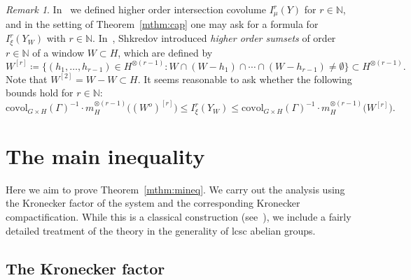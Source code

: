 \documentclass{amsart}
\numberwithin{equation}{subsection}
\theoremstyle{remark}
\newtheorem{rem}[thm]{Remark}
\begin{document}
\begin{rem}\label{rem:sumset}
In~\cite[\S7]{AvBjCuI} we defined higher order intersection covolume \(I_{\mu}^{r}\left(Y\right)\) for \(r\in\mathbb{N}\), and in the setting of Theorem~\ref{mthm:cap} one may ask for a formula for \(I_{\xi}^{r}\left(Y_{W}\right)\) with \(r\in\mathbb{N}\). In~\cite{shkredov2015}, Shkredov introduced \emph{higher order sumsets} of order \(r\in\mathbb{N}\) of a window \(W\subset H\), which are defined by
\[W^{\left[r\right]}\coloneqq\big\{ \left(h_{1},\dotsc,h_{r-1}\right)\in H^{\otimes \left(r-1\right)}:W\cap\left(W-h_{1}\right)\cap\dotsm\cap\left(W-h_{r-1}\right)\neq\emptyset\big\}\subset H^{\otimes\left(r-1\right)}.\]
Note that \(W^{\left[2\right]}=W-W\subset H\). It seems reasonable to ask whether the following bounds hold for \(r\in\mathbb{N}\):
\[\mathrm{covol}_{G\times H}\left(\Gamma\right)^{-1}\cdot m_{H}^{\otimes\left(r-1\right)}\big(\left(W^{o}\right)^{\left[r\right]}\big)\leq I_{\xi}^{r}\left(Y_{W}\right)\leq\mathrm{covol}_{G\times H}\left(\Gamma\right)^{-1}\cdot m_{H}^{\otimes\left(r-1\right)}\big(W^{\left[r\right]}\big).\]
\end{rem}

\section{The main inequality}

Here we aim to prove Theorem~\ref{mthm:mineq}. We carry out the analysis using the Kronecker factor of the system and the corresponding Kronecker compactification. While this is a classical construction (see~\cite[\S6.4]{EinsiedlerWard}), we include a fairly detailed treatment of the theory in the generality of lcsc abelian groups.

\subsection{The Kronecker factor}
\end{document}
